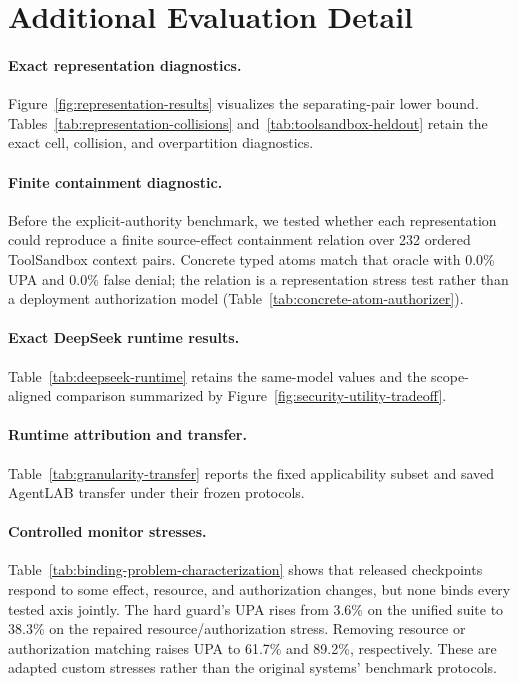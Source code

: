 \section{Additional Evaluation Detail}
\label{app:additional-results}

\paragraph{Exact representation diagnostics.}


Figure~\ref{fig:representation-results} visualizes the separating-pair lower
bound.  Tables~\ref{tab:representation-collisions}
and~\ref{tab:toolsandbox-heldout} retain the exact cell, collision, and
overpartition diagnostics.

\paragraph{Finite containment diagnostic.}

Before the explicit-authority benchmark, we tested whether each representation
could reproduce a finite source-effect containment relation over 232 ordered
ToolSandbox context pairs. Concrete typed atoms match that oracle with 0.0\%
UPA and 0.0\% false denial; the relation is a representation stress test rather than
a deployment authorization model (Table~\ref{tab:concrete-atom-authorizer}).

\paragraph{Exact DeepSeek runtime results.}


Table~\ref{tab:deepseek-runtime} retains the same-model values and the
scope-aligned comparison summarized by
Figure~\ref{fig:security-utility-tradeoff}.

\paragraph{Runtime attribution and transfer.}

Table~\ref{tab:granularity-transfer} reports the fixed applicability subset and
saved AgentLAB transfer under their frozen protocols.



\paragraph{Controlled monitor stresses.}

Table~\ref{tab:binding-problem-characterization} shows that released
checkpoints respond to some effect, resource, and authorization
changes, but none binds every tested axis jointly.  The hard guard's UPA rises
from 3.6\% on the unified suite to 38.3\% on the repaired resource/authorization
stress.  Removing resource or authorization matching raises UPA to 61.7\% and
89.2\%, respectively.  These are adapted custom stresses rather than
the original systems' benchmark protocols.

